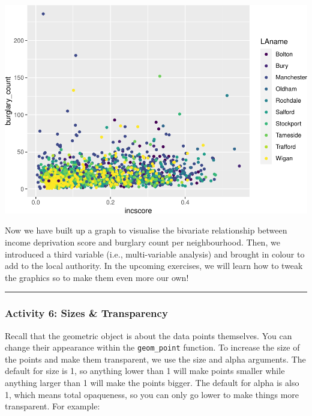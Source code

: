 \documentclass[
]{book}
\begin{document}
\includegraphics{03-data-visualisation_files/figure-latex/unnamed-chunk-9-1.pdf}

Now we have built up a graph to visualise the bivariate relationship between income deprivation score and burglary count per neighbourhood. Then, we introduced a third variable (i.e., multi-variable analysis) and brought in colour to add to the local authority. In the upcoming exercises, we will learn how to tweak the graphics so to make them even more our own!

\begin{center}\rule{0.5\linewidth}{0.5pt}\end{center}

\hypertarget{activity-6-sizes-transparency}{%
\subsubsection{Activity 6: Sizes \& Transparency}\label{activity-6-sizes-transparency}}

Recall that the geometric object is about the data points themselves. You can change their appearance within the \texttt{geom\_point} function. To increase the size of the points and make them transparent, we use the size and alpha arguments. The default for size is 1, so anything lower than 1 will make points smaller while anything larger than 1 will make the points bigger. The default for alpha is also 1, which means total opaqueness, so you can only go lower to make things more transparent. For example:
\end{document}
